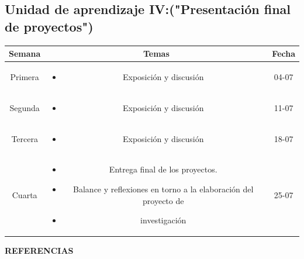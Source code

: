 \documentclass[a4paper]{article}
\begin{document}
\subsection{Unidad de aprendizaje IV:("Presentación final de proyectos")}
\begin{table}[ht]
\centering
\begin{tabular}{|c|c|c|}
\hline
\textbf{Semana} & \textbf{Temas} & \textbf{Fecha} \\ 
\hline
Primera 
& \begin{minipage}[t]{10cm}
\begin{itemize}
\item Exposición y discusión
\end{itemize}
\end{minipage} & 04-07\\ 
\hline 
Segunda 
& \begin{minipage}[t]{10cm}
\begin{itemize}
\item Exposición y discusión
\end{itemize}
\end{minipage} & 11-07\\ 
\hline 
Tercera 
& \begin{minipage}[t]{10cm}
\begin{itemize}
\item Exposición y discusión
\end{itemize}
\end{minipage} & 18-07 \\ 
\hline 
Cuarta 
& \begin{minipage}[t]{10cm}
\begin{itemize}
\item Entrega final de los proyectos.
\item Balance y reflexiones en torno a la elaboración del proyecto de
\item investigación
\end{itemize}
\end{minipage} & 25-07 \\ 
\hline 
\end{tabular}
\end{table}
{\huge \bf REFERENCIAS}\\[0.3cm]
\end{document}
